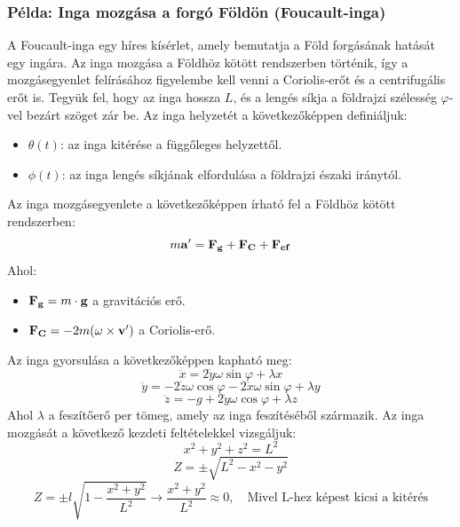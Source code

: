 \documentclass[../main.tex]{subfiles}
\begin{document}
\subsubsection*{Példa: Inga mozgása a forgó Földön (Foucault-inga)}
A Foucault-inga egy híres kísérlet, amely bemutatja a Föld forgásának hatását egy ingára. Az inga mozgása a Földhöz kötött rendszerben történik, így a mozgásegyenlet felírásához figyelembe kell venni a Coriolis-erőt és a centrifugális
erőt is. Tegyük fel, hogy az inga hossza $L$, és a lengés síkja a földrajzi szélesség $\varphi$-vel bezárt szöget zár be. Az inga helyzetét a következőképpen definiáljuk:
\begin{itemize}
    \item $\theta(t)$: az inga kitérése a függőleges helyzettől.
    \item $\phi(t)$: az inga lengés síkjának elfordulása a földrajzi északi iránytól.
\end{itemize}
Az inga mozgásegyenlete a következőképpen írható fel a Földhöz kötött rendszerben:
\begin{equation}
    m\bold{a'} = \bold{F_g} + \bold{F_C} + \bold{F_{cf}}
\end{equation}
Ahol:
\begin{itemize}
    \item $\bold{F_g} = m\cdot \bold{g}$ a gravitációs erő.
    \item $\bold{F_C} = -2m(\bold{\omega} \times \bold{v'})$ a Coriolis-erő.
\end{itemize}
Az inga gyorsulása a következőképpen kapható meg:
\begin{equation}
    \ddot{x} = 2\dot{y}\omega\sin\varphi + \lambda x
\end{equation}
\begin{equation}
    \ddot{y} = -2\dot{z}\omega\cos\varphi -2\dot{x}\omega\sin\varphi + \lambda y
\end{equation}
\begin{equation}
    \ddot{z} = -g + 2 \dot{y}\omega\cos\varphi + \lambda z
\end{equation}
Ahol $\lambda$ a feszítőerő per tömeg, amely az inga feszítéséből származik. Az inga mozgását a következő kezdeti feltételekkel vizsgáljuk:
\begin{equation}
    x^2 + y^2 + z^2 = L^2
\end{equation}
\begin{equation}
    Z = \pm \sqrt{L^2 - x^2 - y^2}
\end{equation}
\begin{equation}
    Z = \pm l \sqrt{1 - \frac{x^2 + y^2}{L^2}} \rightarrow \frac{x^2 + y^2}{L^2} \approx 0, \quad \text{Mivel L-hez képest kicsi a kitérés}
\end{equation}
\end{document}
